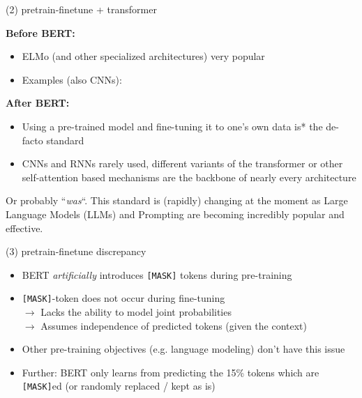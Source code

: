
\begin{frame}{(2) pretrain-finetune + transformer}

\vfill

\textbf{Before BERT:} 
			\begin{itemize}
				\item ELMo (and other specialized architectures) very popular
				\item Examples (also CNNs): 
			\end{itemize}
\textbf{After BERT:}
			\begin{itemize}
				\item Using a pre-trained model and fine-tuning it to one's own data is* the de-facto standard
				\item CNNs and RNNs rarely used, different variants of the transformer or other self-attention based mechanisms are the backbone of nearly every architecture
			\end{itemize}

\vfill

{\scriptsize *Or probably ``\textit{was}``. This standard is (rapidly) changing at the moment as Large Language Models (LLMs) and Prompting are becoming incredibly popular and effective.}
\end{frame}


\begin{frame}{(3) pretrain-finetune discrepancy}

\vfill

	\begin{itemize}
		\item BERT \textit{artificially} introduces \texttt{[MASK]} tokens during pre-training
		\item \texttt{[MASK]}-token does not occur during fine-tuning\\
					$\rightarrow$ Lacks the ability to model joint probabilities\\
					$\rightarrow$ Assumes independence of predicted tokens (given the context)
		\item Other pre-training objectives (e.g. language modeling) don't have this issue
		\item Further: BERT only learns from predicting the 15\% tokens which are \texttt{[MASK]}ed (or randomly replaced / kept as is)
	\end{itemize}

\vfill

\end{frame}

